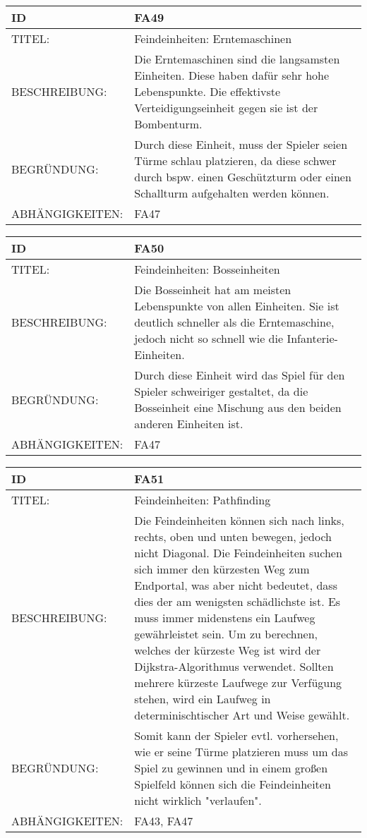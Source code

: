 \documentclass{uulm-assignment}
\begin{document}
\begin{tabularx}{16cm}{l|X}
\textbf{ID} & \textbf{FA49} \\
\hline
TITEL: & Feindeinheiten: Erntemaschinen \\
\hline
BESCHREIBUNG: & Die Erntemaschinen sind die langsamsten Einheiten. Diese haben dafür sehr hohe Lebenspunkte. Die effektivste Verteidigungseinheit gegen sie ist der Bombenturm.
\\
\hline
BEGRÜNDUNG: & Durch diese Einheit, muss der Spieler seien Türme schlau platzieren, da diese schwer durch bspw. einen Geschützturm oder einen Schallturm aufgehalten werden können. \\ 
\hline
ABHÄNGIGKEITEN: & FA47\\ 
\end{tabularx}

\begin{tabularx}{16cm}{l|X}
\textbf{ID} & \textbf{FA50} \\
\hline
TITEL: & Feindeinheiten: Bosseinheiten  \\
\hline
BESCHREIBUNG: & Die Bosseinheit hat am meisten Lebenspunkte von allen Einheiten. Sie ist deutlich schneller als die Erntemaschine, jedoch nicht so schnell wie die Infanterie-Einheiten.
\\
\hline
BEGRÜNDUNG: & Durch diese Einheit wird das Spiel für den Spieler schweiriger gestaltet, da die Bosseinheit eine Mischung aus den beiden anderen Einheiten ist. \\ 
\hline
ABHÄNGIGKEITEN: & FA47\\
\end{tabularx}

\begin{tabularx}{16cm}{l|X}
\textbf{ID} & \textbf{FA51} \\
\hline
TITEL: & Feindeinheiten: Pathfinding \\ 
\hline
BESCHREIBUNG: & Die Feindeinheiten können sich nach links, rechts, oben und unten bewegen, jedoch nicht Diagonal. Die Feindeinheiten suchen sich immer den kürzesten Weg zum Endportal, was aber nicht bedeutet, dass dies der am wenigsten schädlichste ist. Es muss immer midenstens ein Laufweg gewährleistet sein. Um zu berechnen, welches der kürzeste Weg ist wird der  Dijkstra-Algorithmus verwendet. Sollten mehrere kürzeste Laufwege zur Verfügung stehen, wird ein Laufweg in determinischtischer Art und Weise gewählt.
\\ 
\hline
BEGRÜNDUNG: & Somit kann der Spieler evtl. vorhersehen, wie er seine Türme platzieren muss um das Spiel zu gewinnen und in einem großen Spielfeld können sich die Feindeinheiten nicht wirklich "verlaufen". \\ 
\hline
ABHÄNGIGKEITEN: & FA43, FA47\\ 
\end{tabularx}
\end{document}
